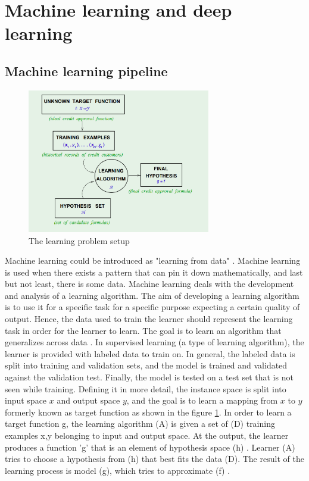 \section{Machine learning and deep learning}
\subsection{Machine learning pipeline}
\begin{figure}[t]
            \includegraphics[width=8cm]{thesis/figures/MLpipeline.PNG}
            \centering
            \caption{The learning problem setup\cite{abu2012learning}}
            \label{fig:The learning problem setup}
        \end{figure}
Machine learning could be introduced as "learning from data" \cite{abu2012learning}. Machine learning is used when there exists a pattern that can pin it down mathematically, and last but not least, there is some data\cite{abu2012learning}. Machine learning deals with the development and analysis of a learning algorithm.  The aim of developing a learning algorithm is to use it for a specific task for a specific purpose expecting a certain quality of output\cite{abu2012learning}.  Hence, the data used to train the learner should represent the learning task in order for the learner to learn.  The goal is to learn an algorithm that generalizes across data \cite{abu2012learning}. In supervised learning (a type of learning algorithm), the learner is provided with labeled data to train on. In general, the labeled data is split into training and validation sets, and the model is trained and validated against the validation test. Finally, the model is tested on a test set that is not seen while training\cite{abu2012learning}. Defining it in more detail, the instance space is split into input space $x$ and output space $y$, and the goal is to learn a mapping from $x$ to $y$ formerly known as target function as shown in the figure \ref{fig:The learning problem setup}. In order to learn a target function g, the learning algorithm (A) is given a set of (D) training examples {x,y} belonging to input and output space\cite{abu2012learning}. At the output, the learner produces a function 'g' that is an element of hypothesis space (h) \cite{abu2012learning}. Learner (A) tries to choose a hypothesis from (h) that best fits the data (D). The result of the learning process is model (g), which tries to approximate (f)  \cite{abu2012learning}.
